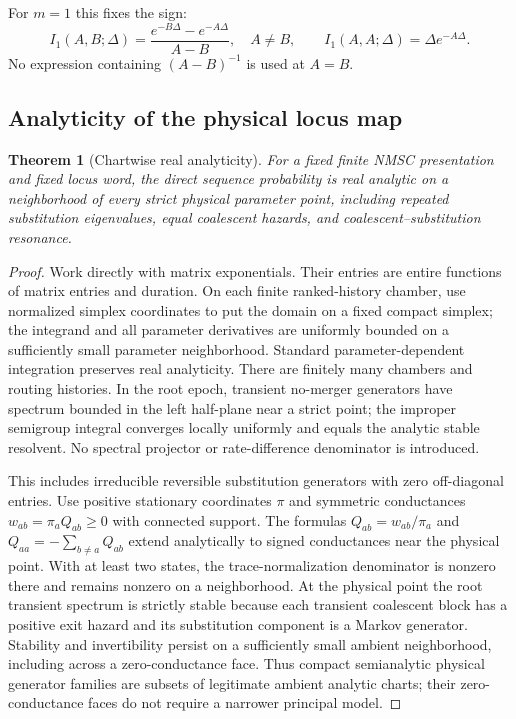 \documentclass[11pt]{article}
\newtheorem{theorem}{Theorem}[section]
\begin{document}
For $m=1$ this fixes the sign:
\[
I_1(A,B;\Delta)=\frac{e^{-B\Delta}-e^{-A\Delta}}{A-B},
\quad A\ne B,
\qquad
I_1(A,A;\Delta)=\Delta e^{-A\Delta}.
\]
No expression containing $(A-B)^{-1}$ is used at $A=B$.

\subsection{Analyticity of the physical locus map}

\begin{theorem}[Chartwise real analyticity]
For a fixed finite NMSC presentation and fixed locus word, the direct sequence probability is real analytic on a neighborhood of every strict physical parameter point, including repeated substitution eigenvalues, equal coalescent hazards, and coalescent--substitution resonance.
\end{theorem}

\begin{proof}
Work directly with matrix exponentials.  Their entries are entire functions of matrix entries and duration.  On each finite ranked-history chamber, use normalized simplex coordinates to put the domain on a fixed compact simplex; the integrand and all parameter derivatives are uniformly bounded on a sufficiently small parameter neighborhood.  Standard parameter-dependent integration preserves real analyticity.  There are finitely many chambers and routing histories.  In the root epoch, transient no-merger generators have spectrum bounded in the left half-plane near a strict point; the improper semigroup integral converges locally uniformly and equals the analytic stable resolvent.  No spectral projector or rate-difference denominator is introduced.

This includes irreducible reversible substitution generators with zero off-diagonal entries.  Use positive stationary coordinates $\pi$ and symmetric conductances $w_{ab}=\pi_aQ_{ab}\ge0$ with connected support.  The formulas $Q_{ab}=w_{ab}/\pi_a$ and $Q_{aa}=-\sum_{b\ne a}Q_{ab}$ extend analytically to signed conductances near the physical point.  With at least two states, the trace-normalization denominator is nonzero there and remains nonzero on a neighborhood.  At the physical point the root transient spectrum is strictly stable because each transient coalescent block has a positive exit hazard and its substitution component is a Markov generator.  Stability and invertibility persist on a sufficiently small ambient neighborhood, including across a zero-conductance face.  Thus compact semianalytic physical generator families are subsets of legitimate ambient analytic charts; their zero-conductance faces do not require a narrower principal model.
\end{proof}
\end{document}
